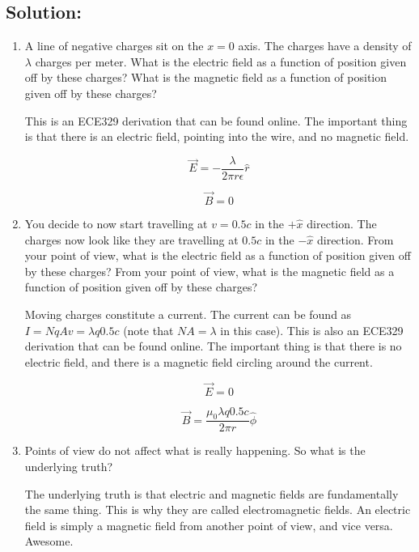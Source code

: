 \documentclass{article}
\begin{document}
\subsection{Solution:}

\begin{enumerate}[label=(\alph*)]
    \item A line of negative charges sit on the $x = 0$ axis. The charges have a density of $\lambda$ charges per meter. What is the electric field as a function of position given off by these charges? What is the magnetic field as a function of position given off by these charges?

    This is an ECE329 derivation that can be found online. The important thing is that there is an electric field, pointing into the wire, and no magnetic field.
    
    $$\boxed{\vec{E} = -\frac{\lambda}{2 \pi r \epsilon} \hat{r}}$$

    $$\boxed{\vec{B} = 0}$$

    \vfill
    
    \item You decide to now start travelling at $v = 0.5c$ in the $+\hat{x}$ direction. The charges now look like they are travelling at $0.5c$ in the $-\hat{x}$ direction. From your point of view, what is the electric field as a function of position given off by these charges? From your point of view, what is the magnetic field as a function of position given off by these charges?

    Moving charges constitute a current. The current can be found as $I = NqAv = \lambda q 0.5 c$ (note that $NA = \lambda$ in this case). This is also an ECE329 derivation that can be found online. The important thing is that there is no electric field, and there is a magnetic field circling around the current.

    $$\boxed{\vec{E} = 0}$$

    $$\boxed{\vec{B} = \frac{\mu_0 \lambda q 0.5 c}{2 \pi r} \hat{\phi}}$$

    \vfill
    
    \item Points of view do not affect what is really happening. So what is the underlying truth?

    The underlying truth is that electric and magnetic fields are fundamentally the same thing. This is why they are called electromagnetic fields. An electric field is simply a magnetic field from another point of view, and vice versa. Awesome.
\end{enumerate}
\end{document}
